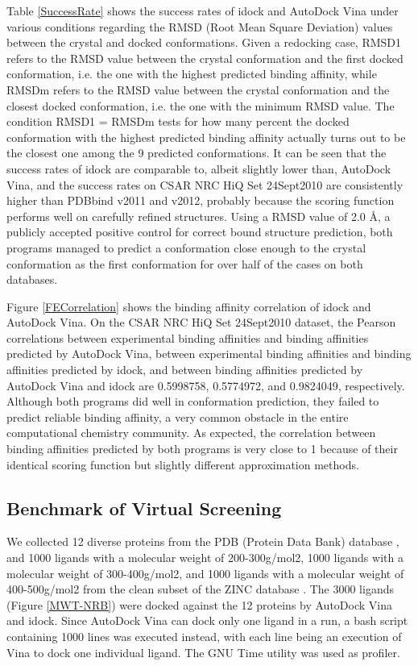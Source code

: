 \documentclass[12pt]{article}
\begin{document}
Table \ref{SuccessRate} shows the success rates of idock and AutoDock Vina under various conditions regarding the RMSD (Root Mean Square Deviation) values between the crystal and docked conformations. Given a redocking case, RMSD1 refers to the RMSD value between the crystal conformation and the first docked conformation, i.e. the one with the highest predicted binding affinity, while RMSDm refers to the RMSD value between the crystal conformation and the closest docked conformation, i.e. the one with the minimum RMSD value. The condition RMSD1 = RMSDm tests for how many percent the docked conformation with the highest predicted binding affinity actually turns out to be the closest one among the 9 predicted conformations. It can be seen that the success rates of idock are comparable to, albeit slightly lower than, AutoDock Vina, and the success rates on CSAR NRC HiQ Set 24Sept2010 are consistently higher than PDBbind v2011 and v2012, probably because the scoring function performs well on carefully refined structures. Using a RMSD value of 2.0 \AA, a publicly accepted positive control for correct bound structure prediction, both programs managed to predict a conformation close enough to the crystal conformation as the first conformation for over half of the cases on both databases.

Figure \ref{FECorrelation} shows the binding affinity correlation of idock and AutoDock Vina. On the CSAR NRC HiQ Set 24Sept2010 dataset, the Pearson correlations between experimental binding affinities and binding affinities predicted by AutoDock Vina, between experimental binding affinities and binding affinities predicted by idock, and between binding affinities predicted by AutoDock Vina and idock are 0.5998758, 0.5774972, and 0.9824049, respectively. Although both programs did well in conformation prediction, they failed to predict reliable binding affinity, a very common obstacle in the entire computational chemistry community. As expected, the correlation between binding affinities predicted by both programs is very close to 1 because of their identical scoring function but slightly different approximation methods.

\subsection*{\sffamily \large Benchmark of Virtual Screening}

We collected 12 diverse proteins from the PDB (Protein Data Bank) database \cite{540,537}, and 1000 ligands with a molecular weight of 200-300g/mol2, 1000 ligands with a molecular weight of 300-400g/mol2, and 1000 ligands with a molecular weight of 400-500g/mol2 from the clean subset of the ZINC database \cite{532,1178}. The 3000 ligands (Figure \ref{MWT-NRB}) were docked against the 12 proteins by AutoDock Vina and idock. Since AutoDock Vina can dock only one ligand in a run, a bash script containing 1000 lines was executed instead, with each line being an execution of Vina to dock one individual ligand. The GNU Time utility was used as profiler.
\end{document}
